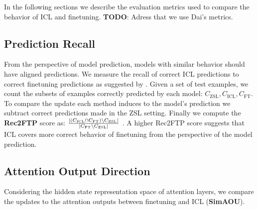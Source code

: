 In the following sections we describe the evaluation metrics used to compare the behavior of ICL and finetuning.
\textbf{TODO}: Adress that we use Dai's metrics.

\subsection*{Prediction Recall}

From the perspective of model prediction, models with similar behavior should have aligned predictions.
We measure the recall of correct ICL predictions to correct finetuning predictions as suggested by \cite{dai2023gpt}.
Given a set of test examples, we count the subsets of examples correctly predicted by each model: $C_{\text{ZSL}}, C_{\text{ICL}}, C_{\text{FT}}$.
To compare the update each method induces to the model's prediction we subtract correct predictions made in the ZSL setting.
Finally we compute the \textbf{Rec2FTP} score as: $\frac{ \left| \left( C_{\text{ICL}} \cap C_{\text{FT}} \right) \setminus C_{\text{ZSL}} \right| }{ \left| C_{\text{FT}} \setminus C_{\text{ZSL}} \right| }$ .
A higher Rec2FTP score suggests that ICL covers more correct behavior of finetuning from the perspective of the model prediction.


\subsection*{Attention Output Direction}
Considering the hidden state representation space of attention layers, we compare the updates to the attention outputs between finetuning and ICL (\textbf{SimAOU})\cite{dai2023gpt}.
